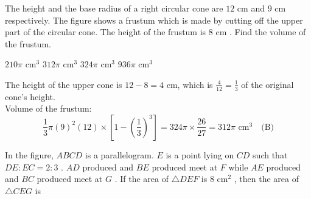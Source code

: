 
\question The height and the base radius of a right circular cone are $12\text{ cm}$ and $9\text{ cm}$ respectively. The figure shows a frustum which is made by cutting off the upper part of the circular cone. The height of the frustum is $8\text{ cm}$ . Find the volume of the frustum.

\begin{minipage}{0.45\textwidth}
\begin{choices}
    \choice $210\pi\text{ cm}^3$
    \correctchoice $312\pi\text{ cm}^3$
    \choice $324\pi\text{ cm}^3$
    \choice $936\pi\text{ cm}^3$
\end{choices}
\end{minipage}
\begin{minipage}{0.52\textwidth}
\centering
{}
\end{minipage}
\begin{solution}
The height of the upper cone is $12 - 8 = 4\text{ cm}$, which is $\frac{4}{12} = \frac{1}{3}$ of the original cone's height. \\
Volume of the frustum:
\[ \frac{1}{3}\pi(9)^2(12) \times \left[1 - \left(\frac{1}{3}\right)^3\right] = 324\pi \times \frac{26}{27} = 312\pi\text{ cm}^3 \quad \text{(B)} \]
\end{solution}

\question In the figure, $ABCD$ is a parallelogram. $E$ is a point lying on $CD$ such that $DE : EC = 2 : 3$ . $AD$ produced and $BE$ produced meet at $F$ while $AE$ produced and $BC$ produced meet at $G$ . If the area of $\triangle DEF$ is $8\text{ cm}^2$ , then the area of $\triangle CEG$ is

